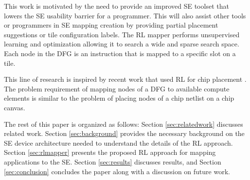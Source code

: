 This work is motivated by the need to provide an improved SE toolset that lowers the SE usability barrier for a programmer.
This will also assist other tools or programmers in SE mapping creation by providing partial placement suggestions or tile configuration labels.
The RL mapper performs unsupervised learning and optimization allowing it to search a wide and sparse search space. 
Each node in the DFG is an instruction that is mapped to a specific slot on a tile.

This line of research is inspired by recent work that used RL for chip placement \cite{mirhoseini2020chip}.
The problem requirement of mapping nodes of a DFG to available compute elements is similar to the problem of placing nodes of a chip netlist on a chip canvas. 

The rest of this paper is organized as follows: 
Section \ref{sec:relatedwork} discusses related work.
Section \ref{sec:background} provides the necessary background on the SE device architecture needed to understand the details of the RL approach.
Section \ref{sec:rlmapper} presents the proposed RL approach for mapping applications to the SE.
Section \ref{sec:results} discusses results, and Section \ref{sec:conclusion} concludes the paper along with a discussion on future work.